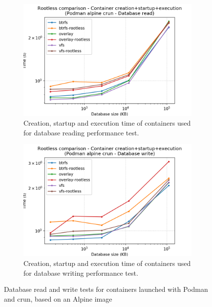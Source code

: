 \begin{figure}[h!]
    \begin{subfigure}{.5\textwidth}
      \centering
      \includegraphics[width=\linewidth]{images/rootless/rootless-full-Podman-alpine-crun---Database-read.png}
      \caption{Creation, startup and execution time of containers used for database reading performance test.}
      \label{fig:rootless:db-read-full}
    \end{subfigure}
    \begin{subfigure}{.5\textwidth}
      \centering
      \includegraphics[width=\linewidth]{images/rootless/rootless-full-Podman-alpine-crun---Database-write.png}
      \caption{Creation, startup and execution time of containers used for database writing performance test.}
      \label{fig:rootless:db-write-full}
    \end{subfigure}
    
    \caption{Database read and write tests for containers launched with Podman and crun, based on an Alpine image}
    \label{fig:rootless:db}
\end{figure}

